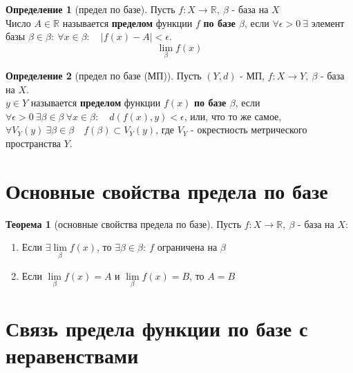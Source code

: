 \documentclass{report}
\theoremstyle{definition}
\newtheorem*{definition}{Определение}
\newtheorem*{theorem}{Теорема}
\begin{document}
\begin{definition}[предел по базе]
    Пусть $f:X\rightarrow\mathbb{R}, \ \beta$ - база на $X$\\

    Число $A\in\mathbb{R}$ называется \textbf{пределом} функции $f$ \textbf{по базе $\beta$}, если
    $\forall \epsilon > 0 \ \exists$ элемент базы $\beta \in \beta: \ \forall x \in \beta: \quad |f(x) - A| < \epsilon$.
    \begin{equation*}
        \underset{\beta}{\lim} f(x)
    \end{equation*}
\end{definition}

\begin{definition}[предел по базе (МП)]
    Пусть $(Y, d)$ - МП, $f:X\rightarrow Y, \ \beta$ - база на $X$.\\

    $y\in Y$ называется \textbf{пределом} функции $f(x)$ \textbf{по базе $\beta$}, если $\forall \epsilon > 0 \
        \exists \beta \in \beta \ \forall x \in \beta: \quad d(f(x), y) < \epsilon$, или, что то же самое,
    $\forall V_{Y}(y) \ \exists \beta \in \beta \quad f(\beta) \subset V_{Y}(y)$, где $V_{Y}$ - окрестность
    метрического пространства $Y$.
\end{definition}

\section{Основные свойства предела по базе}

\begin{theorem}[основные свойства предела по базе]
    Пусть $f:X\rightarrow\mathbb{R}, \ \beta$ - база на $X$:
    \begin{enumerate}
        \item Если $\exists \underset{\beta}{\lim}f(x)$, то $\exists \beta \in \beta: \ f$ ограничена на $\beta$
        \item Если $\underset{\beta}{\lim}f(x) = A$ и $\underset{\beta}{\lim}f(x) = B$, то $A = B$
    \end{enumerate}
\end{theorem}

\section{Связь предела функции по базе с неравенствами}
\end{document}
